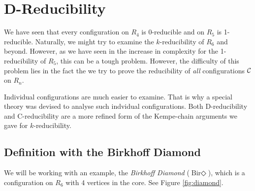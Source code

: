 \clearpage
\section{D-Reducibility}
\label{sec:dreduce}

We have seen that every configuration on $R_4$ is 0-reducible and on $R_5$ is 1-reducible. Naturally, we might try to examine the $k$-reducibility of $R_6$ and beyond. However, as we have seen in the increase in complexity for the 1-reducibility of $R_5$, this can be a tough problem. However, the difficulty of this problem lies in the fact the we try to prove the reducibility of \textit{all} configurations $\mathcal{C}$ on $R_n$. 

Individual configurations are much easier to examine. That is why a special theory was devised to analyse such indvidual configurations. Both D-reducibility and C-reducibility are a more refined form of the Kempe-chain arguments we gave for $k$-reducibility.

\subsection{Definition with the Birkhoff Diamond}

We will be working with an example, the \textit{Birkhoff Diamond}  ($\text{Bir}\Diamond$), which is a configuration on $R_6$ with 4 vertices in the core. See Figure \ref{fig:diamond}.

